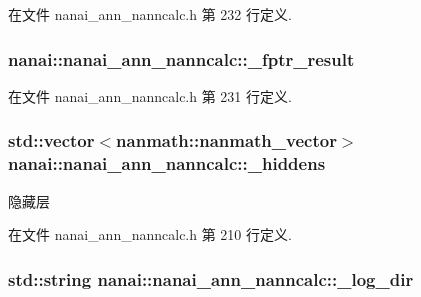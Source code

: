 在文件 nanai\+\_\+ann\+\_\+nanncalc.\+h 第 232 行定义.

\hypertarget{classnanai_1_1nanai__ann__nanncalc_afdaafe5d48d6590d9c38b020452eabce}{}
\subsubsection[{\+\_\+fptr\+\_\+result}]{ nanai\+::nanai\+\_\+ann\+\_\+nanncalc\+::\+\_\+fptr\+\_\+result\hspace{0.3cm}{\ttfamily [protected]}}\label{classnanai_1_1nanai__ann__nanncalc_afdaafe5d48d6590d9c38b020452eabce}


在文件 nanai\+\_\+ann\+\_\+nanncalc.\+h 第 231 行定义.

\hypertarget{classnanai_1_1nanai__ann__nanncalc_a1e15116b2a2d7b5c8ddb9579de11f5ae}{}
\subsubsection[{\+\_\+hiddens}]{\setlength{\rightskip}{0pt plus 5cm}std\+::vector$<${\bf nanmath\+::nanmath\+\_\+vector}$>$ nanai\+::nanai\+\_\+ann\+\_\+nanncalc\+::\+\_\+hiddens\hspace{0.3cm}{\ttfamily [protected]}}\label{classnanai_1_1nanai__ann__nanncalc_a1e15116b2a2d7b5c8ddb9579de11f5ae}
隐藏层 

在文件 nanai\+\_\+ann\+\_\+nanncalc.\+h 第 210 行定义.

\hypertarget{classnanai_1_1nanai__ann__nanncalc_ad02491864e160b837d6b84f635f5947a}{}
\subsubsection[{\+\_\+log\+\_\+dir}]{\setlength{\rightskip}{0pt plus 5cm}std\+::string nanai\+::nanai\+\_\+ann\+\_\+nanncalc\+::\+\_\+log\+\_\+dir\hspace{0.3cm}{\ttfamily [protected]}}\label{classnanai_1_1nanai__ann__nanncalc_ad02491864e160b837d6b84f635f5947a}


